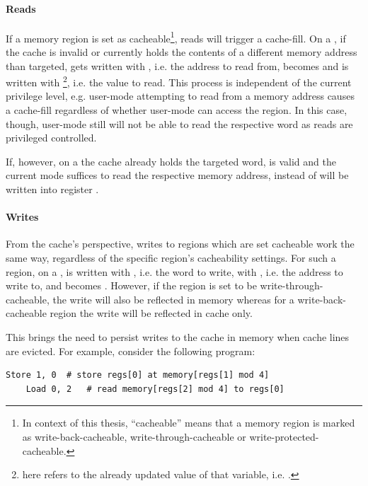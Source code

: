 \paragraph{Reads}
If a memory region is set as cacheable\footnote{%
    In context of this thesis, \enquote{cacheable} means that a memory region is marked as write-back-cacheable, write-through-cacheable or write-protected-cacheable.
}, reads will trigger a cache-fill.
On a , if the cache is invalid or currently holds the contents of a different memory address than targeted,  gets written with , i.e. the address to read from,  becomes  and  is written with \footnote{%
     here refers to the already updated value of that variable, i.e. .
}, i.e. the value to read.
This process is independent of the current privilege level, e.g. user-mode attempting to read from a memory address causes a cache-fill regardless of whether user-mode can access the region.
In this case, though, user-mode still will not be able to read the respective word as reads are privileged controlled.

If, however, on a  the cache already holds the targeted word, is valid and the current mode suffices to read the respective memory address,  instead of  will be written into register .

\paragraph{Writes}
From the cache's perspective, writes to regions which are set cacheable work the same way, regardless of the specific region's cacheability settings.
For such a region, on a ,  is written with , i.e. the word to write,  with , i.e. the address to write to, and  becomes .
However, if the region is set to be write-through-cacheable, the write will also be reflected in memory whereas for a write-back-cacheable region the write will be reflected in cache only.

This brings the need to persist writes to the cache in memory when cache lines are evicted.
For example, consider the following program:
\begin{lstlisting}[language=minrv8]
    Store 1, 0  # store regs[0] at memory[regs[1] mod 4]
    Load 0, 2   # read memory[regs[2] mod 4] to regs[0]
\end{lstlisting}

